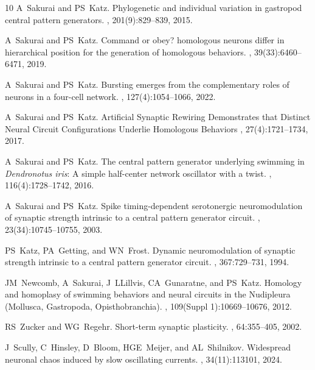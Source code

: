 \documentclass[nofootinbib,aip,amsmath,amssymb,preprint,twocolumn,floatfix,10pt]{revtex4-2}
\begin{document}
\begin{thebibliography}{10}
A~Sakurai and PS~Katz.
\newblock Phylogenetic and individual variation in gastropod central pattern
  generators.
, 201(9):829--839, 2015.


A~Sakurai and PS~Katz.
\newblock Command or obey? homologous neurons differ in hierarchical position
  for the generation of homologous behaviors.
, 39(33):6460--6471, 2019.

A~Sakurai and PS~Katz.
\newblock Bursting emerges from the complementary roles of neurons in a
  four-cell network.
, 127(4):1054--1066, 2022.

A~Sakurai and PS~Katz.
\newblock Artificial Synaptic Rewiring Demonstrates that Distinct Neural Circuit Configurations
Underlie Homologous Behaviors , 27(4):1721--1734, 2017.


A~Sakurai and PS~Katz.
\newblock  The central pattern generator underlying swimming in \emph{Dendronotus iris}: A simple half-center network oscillator with a twist.
 , 116(4):1728--1742, 2016.

A~Sakurai and PS~Katz.
\newblock Spike timing-dependent serotonergic neuromodulation of synaptic strength intrinsic to a central pattern generator circuit.
, 23(34):10745--10755, 2003.

PS~Katz, PA~Getting, and WN~Frost.
\newblock Dynamic neuromodulation of synaptic strength intrinsic to a central pattern generator circuit.
, 367:729--731, 1994.

JM~Newcomb, A~Sakurai, J~LLillvis, CA~Gunaratne, and PS~Katz.
\newblock Homology and homoplasy of swimming behaviors and neural circuits in the Nudipleura (Mollusca, Gastropoda, Opisthobranchia).
, 109(Suppl 1):10669--10676, 2012.

RS~Zucker and WG~Regehr.
\newblock Short-term synaptic plasticity.
, 64:355--405, 2002.

J~Scully, C~Hinsley, D~Bloom, HGE~Meijer, and AL~Shilnikov.
\newblock Widespread neuronal chaos induced by slow oscillating currents.
, 34(11):113101, 2024.


\end{thebibliography}
\end{document}
